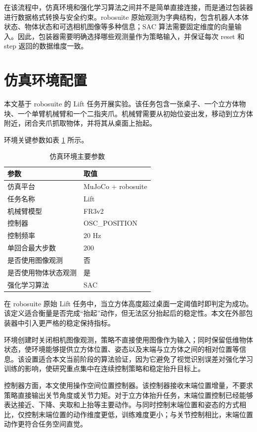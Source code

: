 \documentclass[
    type = bachelor,
    oneside,
    fontset = fandol
]{njuthesis}
\begin{document}
在该流程中，仿真环境和强化学习算法之间并不是简单直接连接，而是通过包装器进行数据格式转换与安全约束。robosuite 原始观测为字典结构，包含机器人本体状态、物体状态和可选相机图像等多种信息；SAC 算法需要固定维度的向量输入。因此，包装器需要明确选择哪些观测量作为策略输入，并保证每次 reset 和 step 返回的数据维度一致。

\section{仿真环境配置}

本文基于 robosuite 的 Lift 任务开展实验。该任务包含一张桌子、一个立方体物块、一个单臂机械臂和一个二指夹爪。机械臂需要从初始位姿出发，移动到立方体附近，闭合夹爪抓取物体，并将其从桌面上抬起。

环境关键参数如表 \ref{tab:env-config} 所示。

\begin{table}[htbp]
  \centering
  \caption{仿真环境主要参数}
  \label{tab:env-config}
  \begin{tabular}{ll}
    \toprule
    参数 & 取值 \\
    \midrule
    仿真平台 & MuJoCo + robosuite \\
    任务名称 & Lift \\
    机械臂模型 & FR3v2 \\
    控制器 & OSC\_POSITION \\
    控制频率 & 20 Hz \\
    单回合最大步数 & 200 \\
    是否使用图像观测 & 否 \\
    是否使用物体状态观测 & 是 \\
    强化学习算法 & SAC \\
    \bottomrule
  \end{tabular}
\end{table}

在 robosuite 原始 Lift 任务中，当立方体高度超过桌面一定阈值时即判定为成功。该定义适合衡量是否完成“抬起”动作，但无法区分抬起后的稳定性。本文在外部包装器中引入更严格的稳定保持指标。

环境创建时关闭相机图像观测，策略不直接使用图像作为输入；同时保留低维物体状态，使环境能够提供立方体位置、姿态以及末端与立方体之间的相对位置等信息。该设置适合本文当前阶段的算法验证，因为它避免了视觉识别误差对强化学习训练的影响，使研究重点集中在连续控制策略和稳定抬升目标上。

控制器方面，本文使用操作空间位置控制器。该控制器接收末端位置增量，不要求策略直接输出关节角度或关节力矩。对于立方体抬升任务，末端位置控制已经能够表达接近、下降、夹取和上抬等主要动作。与同时控制末端位置和姿态的方式相比，仅控制末端位置的动作维度更低，训练难度更小；与关节控制相比，末端位置动作更符合任务空间直觉。
\end{document}
